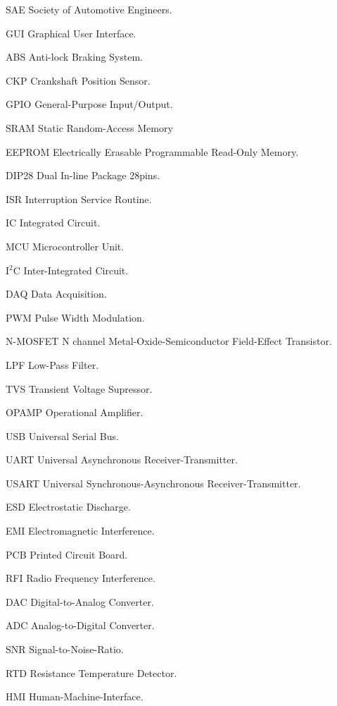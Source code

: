 \begin{siglas}
  \item[SAE] Society of Automotive Engineers.
  \item[GUI] Graphical User Interface.
  \item[ABS] Anti-lock Braking System.
  \item[CKP] Crankshaft Position Sensor.
  \item[GPIO] General-Purpose Input/Output.
  \item[SRAM] Static Random-Access Memory
  \item[EEPROM] Electrically Erasable Programmable Read-Only Memory.
  \item[DIP28] Dual In-line Package 28pins.
  \item[ISR] Interruption Service Routine.
  \item[IC] Integrated Circuit.
  \item[MCU] Microcontroller Unit.
  \item[I$^2$C] Inter-Integrated Circuit.
  \item[DAQ] Data Acquisition.
  \item[PWM] Pulse Width Modulation.
  \item[N-MOSFET] N channel Metal-Oxide-Semiconductor Field-Effect Transistor.
  \item[LPF] Low-Pass Filter.
  \item[TVS] Transient Voltage Supressor.
  \item[OPAMP] Operational Amplifier.
  \item[USB] Universal Serial Bus.
  \item[UART] Universal Asynchronous Receiver-Transmitter.
  \item[USART] Universal Synchronous-Asynchronous Receiver-Transmitter.
  \item[ESD] Electrostatic Discharge.
  \item[EMI] Electromagnetic Interference.
  \item[PCB] Printed Circuit Board.
  \item[RFI] Radio Frequency Interference.
  \item[DAC] Digital-to-Analog Converter.
  \item[ADC] Analog-to-Digital Converter.
  \item[SNR] Signal-to-Noise-Ratio.
  \item[RTD] Resistance Temperature Detector.
  \item[HMI] Human-Machine-Interface.
\end{siglas}
